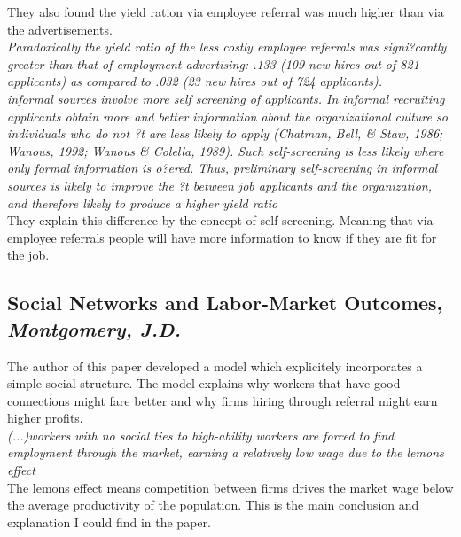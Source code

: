\documentclass[a4paper, 11pt]{article} %
\begin{document}
They also found the yield ration via employee referral was much higher than via the advertisements.\\

\emph{Paradoxically the yield ratio of the less costly employee referrals was
signi?cantly greater than that of employment advertising: .133 (109 new
hires out of 821 applicants) as compared to .032 (23 new hires out of 724
applicants).}\\

\emph{informal sources involve more self screening of applicants. In
informal recruiting applicants obtain more and better information about the
organizational culture so individuals who do not ?t are less likely to apply
(Chatman, Bell, \& Staw, 1986; Wanous, 1992; Wanous \& Colella, 1989).
Such self-screening is less likely where only formal information is o?ered.
Thus, preliminary self-screening in informal sources is likely to improve the
?t between job applicants and the organization, and therefore likely to
produce a higher yield ratio}\\

They explain this difference by the concept of self-screening. Meaning that via employee referrals people will have more information to know if they are fit for the job. 

\subsection*{Social Networks and Labor-Market Outcomes, \emph{Montgomery, J.D.} \cite{twelveth}}
The author of this paper developed a model which explicitely incorporates a simple social structure.
The model explains why workers that have good connections might fare better and why firms hiring through referral might earn higher profits.\\

\emph{(...)workers with no social ties to high-ability workers are forced to find employment through the market, earning a relatively low wage due to the lemons effect} \\
The lemons effect means competition between firms drives the market wage below the average productivity of the population.
This is the main conclusion and explanation I could find in the paper.







\end{document}
